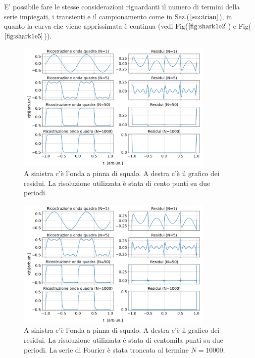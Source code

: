 \documentclass{article}
\begin{document}
            E' possibile fare le stesse considerazioni riguardanti 
            il numero di termini della serie impiegati, i transienti e il campionamento come
            in Sez.($\ref{sez:trian}$), in quanto la curva che viene apprissimata è 
            continua (vedi Fig($\ref{fig:shark1e2}$) e Fig($\ref{fig:shark1e5}$)).
                    \begin{figure}[H]
                        \centering
                        \includegraphics[width=0.85\textwidth]{fousharkfins1e2.png} %
                        \caption{A sinistra c'è l'onda a pinna di squalo.
                        A destra c'è il grafico dei residui.
                        La risoluzione utilizzata è stata di cento punti su due periodi.}
                        \label{fig:shark1e2}
                    \end{figure}
                    \begin{figure}[H]
                        \centering
                        \includegraphics[width=0.85\textwidth]{fousharkfins1e5.png} %
                        \caption{A sinistra c'è l'onda a pinna di squalo.
                        A destra c'è il grafico dei residui.
                        La risoluzione utilizzata è stata di centomila punti su due periodi.
                        La serie di Fourier è stata troncata al termine $N=10000$.}
                        \label{fig:shark1e5}
                    \end{figure}
\end{document}
